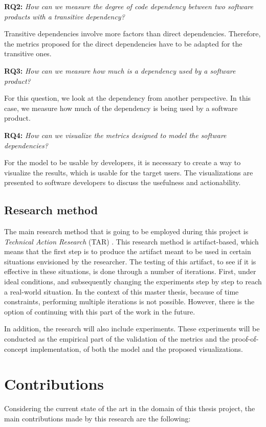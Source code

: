 \blankl
\textbf{RQ2:} \textit{How can we measure the degree of code dependency between two software products with a transitive dependency?}

\blankls
Transitive dependencies involve more factors than direct dependencies. Therefore, the metrics proposed for the direct dependencies have to be adapted for the transitive ones.

\blankl
\textbf{RQ3:} \textit{How can we measure how much is a dependency used by a software product?}

\blankls
For this question, we look at the dependency from another perspective. In this case, we measure how much of the dependency is being used by a software product.

\blankl
\textbf{RQ4:} \textit{How can we visualize the metrics designed to model the software dependencies?}

\blankls
For the model to be usable by developers, it is necessary to create a way to visualize the results, which is usable for the target users. The visualizations are presented to software developers to discuss the usefulness and actionability.

\subsection{Research method}
The main research method that is going to be employed during this project is \textit{Technical Action Research} (TAR) \cite{wieringa2012technical}.
This research method is artifact-based, which means that the first step is to produce the artifact meant to be used in certain situations envisioned by the researcher. The testing of this artifact, to see if it is effective in these situations, is done through a number of iterations. First, under ideal conditions, and subsequently changing the experiments step by step to reach a real-world situation. In the context of this master thesis, because of time constraints, performing multiple iterations is not possible. However, there is the option of continuing with this part of the work in the future.

\blankl
In addition, the research will also include experiments. These experiments will be conducted as the empirical part of the validation of the metrics and the proof-of-concept implementation, of both the model and the proposed visualizations.

\section{Contributions}
Considering the current state of the art in the domain of this thesis project, the main contributions made by this research are the following:

